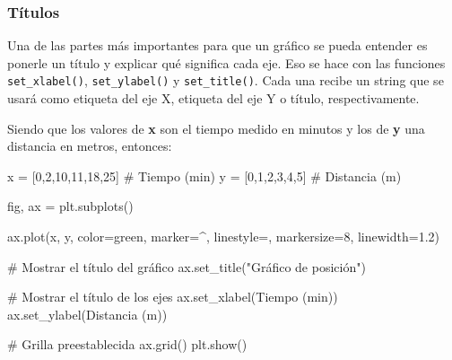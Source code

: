 \documentclass[
  letterpaper,
  DIV=11,
  numbers=noendperiod]{scrreprt}
\newenvironment{Shaded}{\begin{snugshade}}{\end{snugshade}}
\newcommand{\CommentTok}[1]{\textcolor[rgb]{0.37,0.37,0.37}{#1}}
\newcommand{\DecValTok}[1]{\textcolor[rgb]{0.68,0.00,0.00}{#1}}
\newcommand{\FloatTok}[1]{\textcolor[rgb]{0.68,0.00,0.00}{#1}}
\newcommand{\NormalTok}[1]{\textcolor[rgb]{0.00,0.23,0.31}{#1}}
\newcommand{\OperatorTok}[1]{\textcolor[rgb]{0.37,0.37,0.37}{#1}}
\newcommand{\StringTok}[1]{\textcolor[rgb]{0.13,0.47,0.30}{#1}}
\begin{document}
\subsubsection{Títulos}\label{tuxedtulos}

Una de las partes más importantes para que un gráfico se pueda entender
es ponerle un título y explicar qué significa cada eje. Eso se hace con
las funciones \texttt{set\_xlabel()}, \texttt{set\_ylabel()} y
\texttt{set\_title()}. Cada una recibe un string que se usará como
etiqueta del eje X, etiqueta del eje Y o título, respectivamente.

Siendo que los valores de \textbf{x} son el tiempo medido en minutos y
los de \textbf{y} una distancia en metros, entonces:

\begin{Shaded}
\begin{Highlighting}[]
\NormalTok{x }\OperatorTok{=}\NormalTok{ [}\DecValTok{0}\NormalTok{,}\DecValTok{2}\NormalTok{,}\DecValTok{10}\NormalTok{,}\DecValTok{11}\NormalTok{,}\DecValTok{18}\NormalTok{,}\DecValTok{25}\NormalTok{]   }\CommentTok{\# Tiempo (min)}
\NormalTok{y }\OperatorTok{=}\NormalTok{ [}\DecValTok{0}\NormalTok{,}\DecValTok{1}\NormalTok{,}\DecValTok{2}\NormalTok{,}\DecValTok{3}\NormalTok{,}\DecValTok{4}\NormalTok{,}\DecValTok{5}\NormalTok{]       }\CommentTok{\# Distancia (m)}

\NormalTok{fig, ax }\OperatorTok{=}\NormalTok{ plt.subplots()}

\NormalTok{ax.plot(x, y, color}\OperatorTok{=}\StringTok{\textquotesingle{}green\textquotesingle{}}\NormalTok{, marker}\OperatorTok{=}\StringTok{\textquotesingle{}\^{}\textquotesingle{}}\NormalTok{, linestyle}\OperatorTok{=}\StringTok{\textquotesingle{}{-}{-}\textquotesingle{}}\NormalTok{, markersize}\OperatorTok{=}\DecValTok{8}\NormalTok{, linewidth}\OperatorTok{=}\FloatTok{1.2}\NormalTok{)}

\CommentTok{\# Mostrar el título del gráfico}
\NormalTok{ax.set\_title(}\StringTok{"Gráfico de posición"}\NormalTok{)}

\CommentTok{\# Mostrar el título de los ejes}
\NormalTok{ax.set\_xlabel(}\StringTok{\textquotesingle{}Tiempo (min)\textquotesingle{}}\NormalTok{)}
\NormalTok{ax.set\_ylabel(}\StringTok{\textquotesingle{}Distancia (m)\textquotesingle{}}\NormalTok{)}

\CommentTok{\# Grilla preestablecida}
\NormalTok{ax.grid()}
\NormalTok{plt.show()}
\end{Highlighting}
\end{Shaded}
\end{document}
